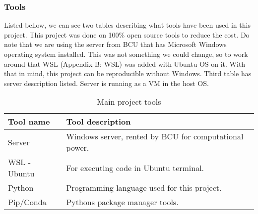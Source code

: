 \subsubsection{Tools}
Listed bellow, we can see two tables describing what tools have been used in this project. This project was done on 100\% open source tools to reduce the cost. 
\newline
Do note that we are using the server from BCU that has Microsoft Windows operating system installed. This was not something we could change, so to work around that WSL (Appendix B: WSL) was added with Ubuntu OS on it. With that in mind, this project can be reproducible without Windows. 
\newline
Third table has server description listed. Server is running as a VM in the host OS.
\begin{table}[ht]
  \centering
    \begin{tabular}{ |m{12em}|m{20em}| } 
     \hline
        Tool name & Tool description \\ 
     \hline
        Server & Windows server, rented by BCU for computational power. \\ 
     \hline
        WSL - Ubuntu & For executing code in Ubuntu terminal. \\
     \hline
        Python & Programming language used for this project. \\
     \hline
        Pip/Conda & Pythons package manager tools.\\
     \hline
    \end{tabular}
\caption{Main project tools}
\end{table}


